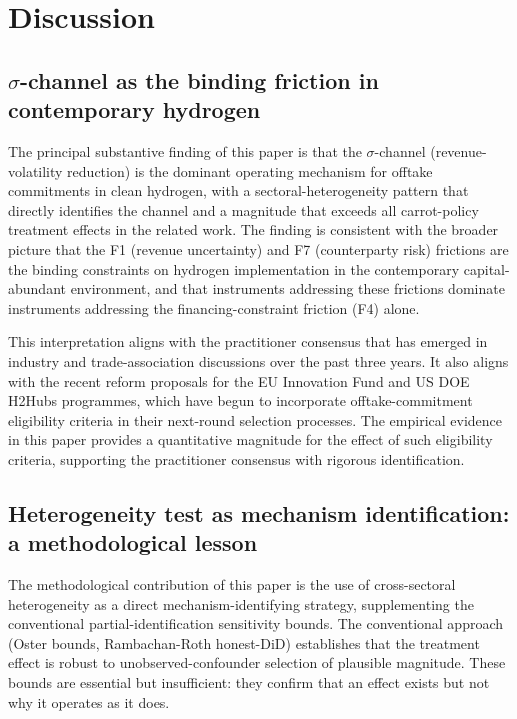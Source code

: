 \documentclass[12pt,a4paper]{article}
\theoremstyle{plain}
\theoremstyle{definition}
\begin{document}
\section{Discussion}
\label{sec:discussion}

\subsection{$\sigma$-channel as the binding friction in contemporary hydrogen}
\label{sec:discussion-sigma}

The principal substantive finding of this paper is that the $\sigma$-channel (revenue-volatility reduction) is the dominant operating mechanism for offtake commitments in clean hydrogen, with a sectoral-heterogeneity pattern that directly identifies the channel and a magnitude that exceeds all carrot-policy treatment effects in the related work. The finding is consistent with the broader picture that the F1 (revenue uncertainty) and F7 (counterparty risk) frictions are the binding constraints on hydrogen implementation in the contemporary capital-abundant environment, and that instruments addressing these frictions dominate instruments addressing the financing-constraint friction (F4) alone.

This interpretation aligns with the practitioner consensus that has emerged in industry and trade-association discussions over the past three years. It also aligns with the recent reform proposals for the EU Innovation Fund and US DOE H2Hubs programmes, which have begun to incorporate offtake-commitment eligibility criteria in their next-round selection processes. The empirical evidence in this paper provides a quantitative magnitude for the effect of such eligibility criteria, supporting the practitioner consensus with rigorous identification.

\subsection{Heterogeneity test as mechanism identification: a methodological lesson}
\label{sec:discussion-heterogeneity}

The methodological contribution of this paper is the use of cross-sectoral heterogeneity as a direct mechanism-identifying strategy, supplementing the conventional partial-identification sensitivity bounds. The conventional approach (Oster bounds, Rambachan-Roth honest-DiD) establishes that the treatment effect is robust to unobserved-confounder selection of plausible magnitude. These bounds are essential but insufficient: they confirm that an effect exists but not why it operates as it does.
\end{document}
